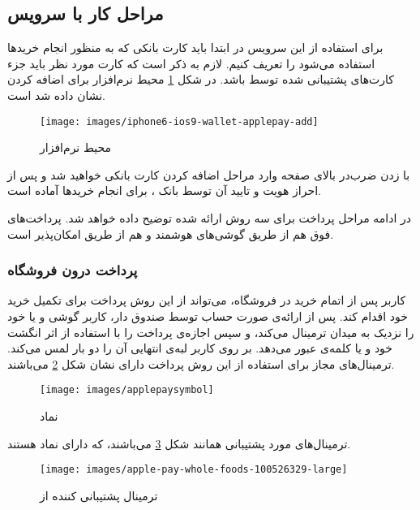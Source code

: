 \documentclass[oneside]{report}
\begin{document}
	\subsection{مراحل کار با سرویس {\large {}} }
	برای استفاده از این سرویس در ابتدا باید کارت بانکی که به منظور انجام خرید‌ها استفاده می‌شود را تعریف کنیم. لازم به ذکر است که کارت مورد نظر باید جزء کارت‌های پشتیبانی شده توسط
									{\large {}} 
									 باشد. در شکل \ref{applepayenvironment} محیط نرم‌افزار برای اضافه کردن نشان داده شد است. 
									 
									 
	\begin{figure}[h]
		\centering
		\texttt{[image: images/iphone6-ios9-wallet-applepay-add]}
		\caption{محیط نرم‌افزار{\footnotesize {}}  }
		\label{applepayenvironment}
	\end{figure}
با زدن ضرب‌در بالای صفحه وارد مراحل اضافه کردن کارت بانکی خواهید شد و پس از احراز هویت و تایید آن توسط بانک ، 
								{\large {}}  
								برای انجام خرید‌ها آماده است. 
								
								در ادامه مراحل پرداخت برای سه روش ارائه شده توضیح داده خواهد شد. پرداخت‌های فوق هم از طریق گوشی‌های هوشمند 
																{\large {}} 
																و هم از طریق 
															{\large {}} 
																								امکان‌پذیر است. 
											
								
	\subsubsection{پرداخت درون فروشگاه} 
	کاربر پس از اتمام خرید در فروشگاه، می‌تواند از این روش پرداخت برای تکمیل خرید خود اقدام کند. پس از  ارائه‌ی صورت حساب توسط صندوق دار، کاربر گوشی و یا 
														{\large {}} 
	 خود را نزدیک به میدان 
									{\large {}}
 ترمینال می‌کند، و سپس اجازه‌ی پرداخت را با استفاده از اثر انگشت خود و یا کلمه‌ی عبور می‌دهد.
 		بر روی  									{\large {}}									 									 									کاربر لبه‌ی انتهایی آن را دو بار لمس می‌کند.
 ترمینال‌های مجاز برای استفاده از این روش پرداخت دارای نشان شکل     
 \ref{applepaysymbol}
می‌باشند.
 \begin{figure}[h]
 	\centering
 	\texttt{[image: images/applepaysymbol]}
 	\caption{نماد 	{\footnotesize {}}}
 	\label{applepaysymbol}
 \end{figure}

 ترمینال‌های مورد پشتیبانی همانند شکل 
 \ref{apple-pay-whole-foods}
 می‌باشند، که دارای نماد 
 									{\large {}}
 									هستند.
	\begin{figure}[h]
		\centering
		\texttt{[image: images/apple-pay-whole-foods-100526329-large]}
		\caption{ترمینال پشتیبانی کننده از {\footnotesize {}}}
		\label{apple-pay-whole-foods}
	\end{figure}
	
\end{document}
